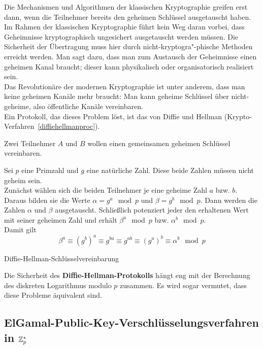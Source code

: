 \begin{refsegment}
Die Mechanismen und Algorithmen der klassischen Kryptographie greifen erst dann, wenn die Teilnehmer bereits den geheimen Schlüssel ausgetauscht haben. Im Rahmen der klassischen Kryptographie  führt kein Weg daran vorbei, dass Geheimnisse kryptographisch ungesichert ausgetauscht werden müssen. Die Sicherheit der Übertragung muss hier durch nicht-kryptogra"-phische Methoden erreicht werden. Man sagt dazu, dass man zum Austausch der Geheimnisse einen geheimen Kanal braucht; dieser kann physikalisch oder organisatorisch realisiert sein.\\
Das Revolutionäre der modernen Kryptographie ist unter anderem, dass man keine geheimen Kanäle mehr braucht: Man kann geheime Schlüssel über nicht-geheime, also öffentliche Kanäle vereinbaren.\\
Ein Protokoll, das dieses Problem löst, ist das von Diffie und Hellman (Krypto-Verfahren~\ref{diffiehellmanproc}).

\begin{cryptoprocedure}
Zwei Teilnehmer $ A $ und $ B $ wollen einen gemeinsamen geheimen Schlüssel vereinbaren. \par
Sei $ p $ eine Primzahl und $ g $ eine natürliche Zahl. Diese beide Zahlen müssen nicht geheim sein.\\
Zunächst wählen sich die beiden Teilnehmer je eine geheime Zahl $ a $ bzw. $ b. $ Daraus bilden sie die Werte $ \alpha = g^{a}\mod p $ und $ \beta = g^b \mod p. $ Dann werden die Zahlen $ \alpha $ und $ \beta $ ausgetauscht. Schließlich potenziert jeder den erhaltenen Wert mit seiner geheimen Zahl und erhält $ \beta^{a} \mod p $ bzw. $ \alpha^b \mod p. $\\
Damit gilt
\[ \beta^{a} \equiv (g^b)^{a} \equiv g^{ba} \equiv g^{ab} \equiv (g^{a})^b \equiv \alpha^b \mod p \]
\caption{Diffie-Hellman-Schlüsselvereinbarung}
\label{diffiehellmanproc}
\end{cryptoprocedure}

Die Sicherheit des {\bf Diffie-Hellman-Protokolls} hängt eng mit der Berechnung des diskreten Logarithmus modulo $p$ zusammen. Es wird sogar vermutet, dass diese Probleme äquivalent sind.


\subsection{ElGamal-Public-Key-Verschlüsselungsverfahren in \texorpdfstring{$ \mathbf{\mathbb{Z}}_p^\ast$}{Zp*}}


\end{refsegment}
